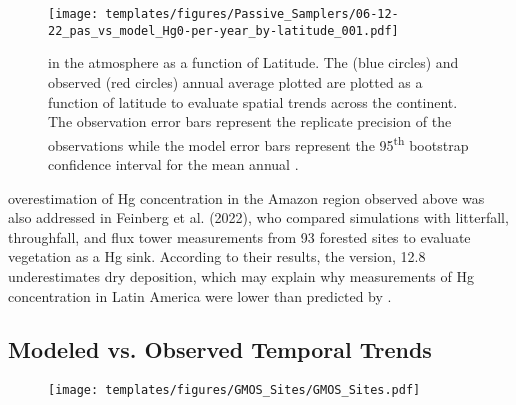 \begin{figure}[H]
  \texttt{[image: templates/figures/Passive\_Samplers/06-12-22\_pas\_vs\_model\_Hg0-per-year\_by-latitude\_001.pdf]}
  \caption{\hg in the atmosphere as a function of Latitude. The \on (blue circles) and observed (red circles) annual average \hg plotted are plotted as a function of latitude to evaluate spatial trends across the continent. The observation error bars represent the replicate precision of the observations while the model error bars represent the 95\textsuperscript{th} bootstrap confidence interval for the mean annual \hg.}
  \label{fig:06-12-22_pas_vs_model_Hg0-per-year_by-latitude_001}
  \centering
  
\end{figure}
\FloatBarrier
\begin{flushleft}
    \gcs overestimation of Hg concentration in the Amazon region observed above was also addressed in Feinberg et al. (2022), who compared simulations with litterfall, throughfall, and flux tower measurements from 93 forested sites to evaluate vegetation as a Hg sink. According to their results, the \gc version, 12.8 underestimates \hg dry deposition, which may explain why measurements of Hg concentration in Latin America were lower than predicted by \gc. 

\end{flushleft}

\subsection{Modeled vs. Observed Temporal Trends}
\begin{figure}[H]
\texttt{[image: templates/figures/GMOS\_Sites/GMOS\_Sites.pdf]}
\centering
{}
\label{fig:GMOSvsGC}
\end{figure}
\FloatBarrier


